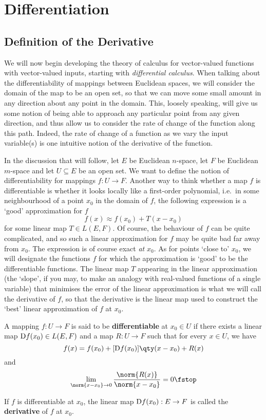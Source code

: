 \chapter{Differentiation}
\section{Definition of the Derivative}
We will now begin developing the theory of calculus for vector-valued functions with vector-valued inputs, starting with \emph{differential calculus}. When talking about the differentiability of mappings between Euclidean spaces, we will consider the domain of the map to be an open set, so that we can move some small amount in any direction about any point in the domain. This, loosely speaking, will give us some notion of being able to approach any particular point from any given direction, and thus allow us to consider the rate of change of the function along this path. Indeed, the rate of change of a function as we vary the input variable(s) is one intuitive notion of the derivative of the function.

\vspace{3mm}

In the discussion that will follow, let \( E \) be Euclidean \( n \)-space, let \( F \) be Euclidean \( m \)-space and let \( U\subseteq E \) be an open set. We want to define the notion of differentiability for mappings \( f:U\to F \). Another way to think whether a map \( f \) is differentiable is whether it looks locally like a first-order polynomial, i.e.\ in some neighbourhood of a point \( x_0 \) in the domain of \( f \), the following expression is a `good' approximation for \( f \)
\[ f(x)\approx f(x_0)+T(x-x_0) \]
for some linear map \( T\in L(E,F) \). Of course, the behaviour of \( f \) can be quite complicated, and so such a linear approximation for \( f \) may be quite bad far away from \( x_0 \). The expression is of course exact \emph{at} \( x_0 \). As for points `close to' \( x_0 \), we will designate the functions \( f \) for which the approximation is `good' to be the differentiable functions. The linear map \( T \) appearing in the linear approximation (the `slope', if you may, to make an analogy with real-valued functions of a single variable) that minimises the error of the linear approximation is what we will call the derivative of \( f \), so that the derivative is the linear map used to construct the `best' linear approximation of \( f \) at \( x_0 \).

\begin{definition}
  \label{def:derivative}
  A mapping \( f:U\to F \) is said to be \textbf{differentiable} at \( x_0\in U \) if there exists a linear map \( \text{D} f(x_0)\in L(E,F) \) and a map \( R:U\to F \) such that for every \( x\in U \), we have
  \[ f(x)=f(x_0)+[\D f(x_0)]\qty(x-x_0)+R(x) \]
  and
  \[ \lim_{\norm{x-x_0}\to 0}\frac{\norm{R(x)}}{\norm{x-x_0}}=0\fstop \]

  If \( f \) is differentiable at \( x_0 \), the linear map \( \text{D} f(x_0):E\to F \) is called the \textbf{derivative} of \( f \) at \( x_0 \).
\end{definition}

